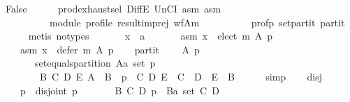 \begin{isabellebody}
\ {\isachardoublequoteopen}False{\isachardoublequoteclose}\isanewline
\ \ \ \ \isamarkupfalse%
\ prod{\isachardot}{\kern0pt}exhaust{\isacharunderscore}{\kern0pt}sel\ DiffE\ UnCI\ asm{}\ asm{}\isanewline
\ \ \ \ \ \ \ \ \ \ module\ profile\ result{\isacharunderscore}{\kern0pt}imp{\isacharunderscore}{\kern0pt}rej\ wf{\isacharunderscore}{\kern0pt}A{\isacharunderscore}{\kern0pt}m\isanewline
\ \ \ \ \ \ \ \ \ \ prof{\isacharunderscore}{\kern0pt}p\ set{\isacharunderscore}{\kern0pt}partit\ partit\isanewline
\ \ \ \ \isamarkupfalse%
\ {\isacharparenleft}{\kern0pt}metis\ {\isacharparenleft}{\kern0pt}no{\isacharunderscore}{\kern0pt}types{\isacharparenright}{\kern0pt}{\isacharparenright}{\kern0pt}\isanewline
{}\isamarkupfalse%
\isanewline
\ \ \isamarkupfalse%
\isanewline
\ \ \ \ x\ {\isacharcolon}{\kern0pt}{\isacharcolon}{\kern0pt}\ {\isachardoublequoteopen}{\isacharprime}{\kern0pt}a{\isachardoublequoteclose}\isanewline
\ \ \isamarkupfalse%
\isanewline
\ \ \ \ asm{}{\isacharcolon}{\kern0pt}\ {\isachardoublequoteopen}x\ {\isasymin}\ elect\ m\ A\ p{\isachardoublequoteclose}\ \isanewline
\ \ \ \ asm{}{\isacharcolon}{\kern0pt}\ {\isachardoublequoteopen}x\ {\isasymin}\ defer\ m\ A\ p{\isachardoublequoteclose}\isanewline
\ \ \isamarkupfalse%
\ partit{\isacharcolon}{\kern0pt}\isanewline
\ \ \ \ {\isachardoublequoteopen}{\isasymforall}A\ p{\isachardot}{\kern0pt}\isanewline
\ \ \ \ \ \ {\isasymnot}\ set{\isacharunderscore}{\kern0pt}equals{\isacharunderscore}{\kern0pt}partition\ {\isacharparenleft}{\kern0pt}A{\isacharcolon}{\kern0pt}{\isacharcolon}{\kern0pt}{\isacharprime}{\kern0pt}a\ set{\isacharparenright}{\kern0pt}\ p\ {\isasymor}\isanewline
\ \ \ \ \ \ \ \ {\isacharparenleft}{\kern0pt}{\isasymexists}B\ C\ D\ E{\isachardot}{\kern0pt}\ A\ {\isacharequal}{\kern0pt}\ B\ {\isasymand}\ p\ {\isacharequal}{\kern0pt}\ {\isacharparenleft}{\kern0pt}C{\isacharcomma}{\kern0pt}\ D{\isacharcomma}{\kern0pt}\ E{\isacharparenright}{\kern0pt}\ {\isasymand}\ C\ {\isasymunion}\ D\ {\isasymunion}\ E\ {\isacharequal}{\kern0pt}\ B{\isacharparenright}{\kern0pt}{\isachardoublequoteclose}\isanewline
\ \ \ \ \isamarkupfalse%
\ simp\isanewline
\ \ \isamarkupfalse%
\ disj{\isacharcolon}{\kern0pt}\isanewline
\ \ \ \ {\isachardoublequoteopen}{\isasymforall}p{\isachardot}{\kern0pt}\ {\isasymnot}\ disjoint{}\ p\ {\isasymor}\isanewline
\ \ \ \ \ \ {\isacharparenleft}{\kern0pt}{\isasymexists}B\ C\ D{\isachardot}{\kern0pt}\ p\ {\isacharequal}{\kern0pt}\ {\isacharparenleft}{\kern0pt}B{\isacharcolon}{\kern0pt}{\isacharcolon}{\kern0pt}{\isacharprime}{\kern0pt}a\ set{\isacharcomma}{\kern0pt}\ C{\isacharcomma}{\kern0pt}\ D{\isacharparenright}{\kern0pt}\ {\isasymand}\isanewline

\end{isabellebody}
